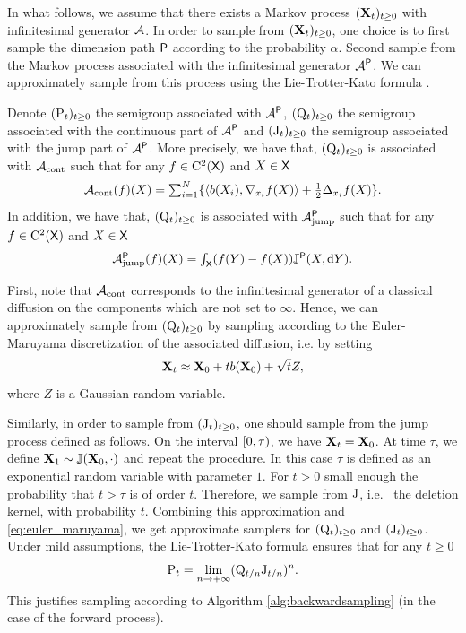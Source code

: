 In what follows, we assume that there exists a Markov process
$(\mathbf{X}_t)_{t \geq 0}$ with infinitesimal generator ${\mathcal{A}}$. In order to sample
from $(\mathbf{X}_t)_{t \geq 0}$, one choice is to first sample the dimension path
$\mathsf{P}$ according to the probability $\alpha$. Second sample from the Markov
process associated with the infinitesimal generator ${\mathcal{A}}^{\mathsf{P}}$. We can
approximately sample from this process using the Lie-Trotter-Kato formula
\cite[Corollary 6.7, p.33]{ethier2009markov}.

Denote $(\mathrm{P}_t)_{t \geq 0}$ the semigroup associated with ${\mathcal{A}}^{\mathsf{P}}$,
$(\mathrm{Q}_t)_{t \geq 0}$ the semigroup associated with the continuous part of
${\mathcal{A}}^{\mathsf{P}}$ and $(\mathrm{J}_t)_{t \geq 0}$ the semigroup associated with the jump
part of ${\mathcal{A}}^{\mathsf{P}}$. More precisely, we have that, $(\mathrm{Q}_t)_{t \geq 0}$ is
associated with ${\mathcal{A}}_{\mathrm{cont}}$ such that for any $f \in \mathrm{C}^2(\mathsf{X})$
and $X \in \mathsf{X}$
\begin{equation}
  \textstyle {\mathcal{A}}_{\mathrm{cont}}(f)(X) = \sum_{i=1}^N \{ \langle b(X_i), \nabla_{x_i}f(X) \rangle + \tfrac{1}{2} \Delta_{x_i}f(X)\} . 
\end{equation}
In addition, we have that, $(\mathrm{Q}_t)_{t \geq 0}$ is
associated with ${\mathcal{A}}_{\mathrm{jump}}^{\mathsf{P}}$ such that for any $f \in \mathrm{C}^2(\mathsf{X})$
and $X \in \mathsf{X}$
\begin{equation}
  \textstyle {\mathcal{A}}_{\mathrm{jump}}^{\mathsf{P}}(f)(X) = \int_{\mathsf{X}} (f(Y)-f(X)) \mathbb{J}^{\mathsf{P}}(X, \mathrm{d} Y) . 
\end{equation}

First, note that ${\mathcal{A}}_{\mathrm{cont}}$ corresponds to the infinitesimal
generator of a classical diffusion on the components which are not set to
$\infty$. Hence, we can approximately sample from $(\mathrm{Q}_t)_{t \geq 0}$ by
sampling according to the Euler-Maruyama discretization of the associated
diffusion, i.e. by setting
\begin{equation}
  \label{eq:euler_maruyama}
  \mathbf{X}_t \approx \mathbf{X}_0 + t b(\mathbf{X}_0) + \sqrt{t} Z , 
\end{equation}
where $Z$ is a Gaussian random variable.

Similarly, in order to sample from $(\mathrm{J}_t)_{t \geq 0}$, one should sample
from the jump process defined as follows. On the interval $[ 0, \tau )$, we
have $\mathbf{X}_t = \mathbf{X}_0$. At time $\tau$, we define
$\mathbf{X}_1 \sim \mathbb{J}(\mathbf{X}_0, \cdot)$ and repeat the procedure. In this case $\tau$
is defined as an exponential random variable with parameter $1$. For $t > 0$
small enough the probability that $t > \tau$ is of order $t$. Therefore, we
sample from $\mathrm{J}$, i.e.~ the deletion kernel, with probability $t$. Combining
this approximation and \eqref{eq:euler_maruyama}, we get approximate samplers
for $(\mathrm{Q}_t)_{t \geq 0}$ and $(\mathrm{J}_t)_{t \geq 0}$. Under mild assumptions,
the Lie-Trotter-Kato formula ensures that for any $t \geq 0$
\begin{equation}
  \mathrm{P}_t = \lim_{n \to +\infty} (\mathrm{Q}_{t/n} \mathrm{J}_{t/n})^n . 
\end{equation}
This justifies sampling according to Algorithm \ref{alg:backwardsampling} (in
the case of the forward process).

